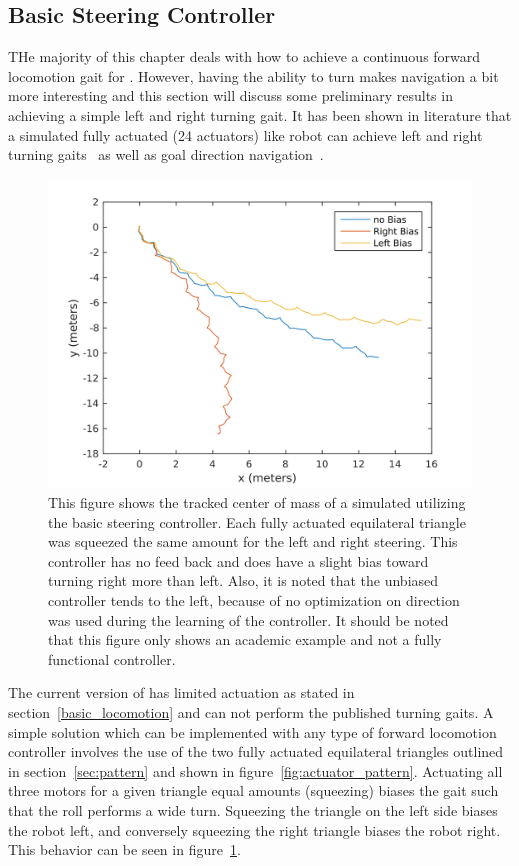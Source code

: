 \subsection{Basic Steering Controller}
\label{sec:steering}
THe majority of this chapter deals with how to achieve a continuous forward locomotion gait for \SB{}.
However, having the ability to turn makes navigation a bit more interesting and this section will discuss some preliminary results in achieving a simple left and right turning gait.
It has been shown in literature that a simulated fully actuated (24 actuators) \SB{} like robot can achieve left and right turning gaits~\cite{kim2014rapid} as well as goal direction navigation~\cite{iscen2014flop}.

\begin{figure}[thbp]
    \vspace{-0.1in}
    \centering
    \includegraphics[width=0.8\linewidth]{tex/img/left_right_paths}
    \caption{
    This figure shows the tracked center of mass of a simulated \SB{} utilizing the basic steering controller.
    Each fully actuated equilateral triangle was squeezed the same amount for the left and right steering.
    This controller has no feed back and does have a slight bias toward turning right more than left.
    Also, it is noted that the unbiased controller tends to the left, because of no optimization on direction was used during the learning of the controller.
    It should be noted that this figure only shows an academic example and not a fully functional controller.
    }
    \label{fig:turning}
    \vspace{-0.1in}
\end{figure}

The current version of \SB{} has limited actuation as stated in section~\ref{basic_locomotion} and can not perform the published turning gaits.
A simple solution which can be implemented with any type of forward locomotion controller involves the use of the two fully actuated equilateral triangles outlined in section~\ref{sec:pattern} and shown in figure~\ref{fig:actuator_pattern}.
Actuating all three motors for a given triangle equal amounts (squeezing) biases the gait such that the roll performs a wide turn.
Squeezing the triangle on the left side biases the robot left, and conversely squeezing the right triangle biases the robot right.
This behavior can be seen in figure~\ref{fig:turning}.

